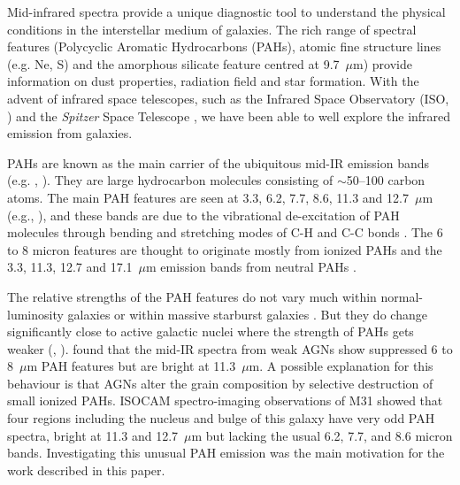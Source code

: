 Mid-infrared spectra provide a unique diagnostic tool to understand the physical conditions in the interstellar medium of galaxies. 
The rich range of spectral features (Polycyclic Aromatic Hydrocarbons (PAHs), atomic fine structure lines (e.g. Ne, S) and the
amorphous silicate feature centred at 9.7~$\mu$m) provide information on dust properties, radiation field and star formation. 
With the advent of infrared space telescopes, such as the Infrared Space Observatory (ISO, \citealt{Kessler1996}) and 
the {\em Spitzer} Space Telescope \citep{spitzer2004}, we have been able to well explore the infrared emission from galaxies. 

PAHs are known as the main carrier of the ubiquitous mid-IR emission bands (e.g. \citealt{Allamandola1989}, 
\citealt{Tielens2008}). They are large hydrocarbon molecules consisting of $\sim$50--100 carbon atoms. 
The main PAH features are seen at 3.3, 6.2, 7.7, 8.6, 11.3 and 12.7~$\mu $m (e.g.\citealt{Mattila1996}, \citealt{Peeters2002}), 
and these bands are due to the vibrational de-excitation of PAH molecules  through bending and stretching modes of C-H and C-C bonds \citep{Tielens:2005lr}. 
The 6 to 8 micron features are thought to originate mostly from ionized PAHs and the 3.3, 11.3, 12.7 and 17.1~$\mu$m 
emission bands from neutral PAHs \citep{Peeters2002}. 

The relative strengths of the PAH features do not vary much within normal-luminosity galaxies \citep{Smith:2007lr} or within 
massive starburst galaxies \citep{Brandl2006}. But they do change significantly close to active galactic nuclei where the 
strength of PAHs gets weaker (\citealt{Roche1991}, \citealt{Smith:2007lr}). \citet{Smith:2007lr}  found that the mid-IR 
spectra from weak AGNs show suppressed 6 to 8~$\mu$m PAH features but are bright at 11.3~$\mu$m. 
A possible explanation for this behaviour is that AGNs alter the grain composition by selective destruction of small ionized PAHs. 
ISOCAM spectro-imaging observations of M31\citep{1998Cesarsky} showed that four regions including the nucleus and bulge 
of this galaxy have very odd PAH spectra, bright at 11.3 and 12.7~$\mu$m but lacking the usual 6.2, 7.7, and 8.6 micron bands. 
Investigating this unusual PAH emission was the main motivation for the work described in this paper. 

